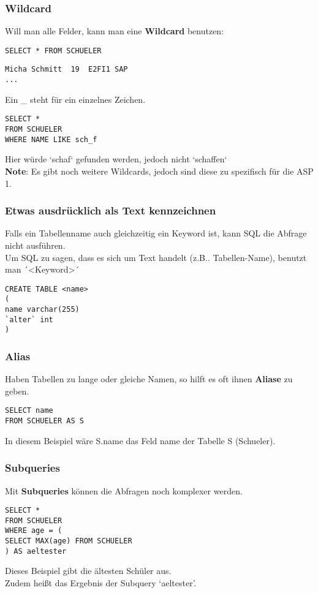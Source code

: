 \documentclass[asp1.tex]{subfiles}
\begin{document}
\subsubsection{Wildcard}
Will man alle Felder, kann man eine \textbf{Wildcard} benutzen:
\begin{lstlisting}
SELECT * FROM SCHUELER
\end{lstlisting}
\begin{verbatim}
Micha Schmitt  19  E2FI1 SAP
...
\end{verbatim}
Ein \_ steht  für  ein einzelnes Zeichen.
\begin{lstlisting}
SELECT *
FROM SCHUELER
WHERE NAME LIKE sch_f
\end{lstlisting}
Hier würde `schaf` gefunden werden,  jedoch nicht `schaffen` \\
\textbf{Note}: Es gibt noch weitere Wildcards, jedoch  sind diese zu spezifisch für die ASP 1.

\subsubsection{Etwas ausdrücklich als Text kennzeichnen}

Falls ein Tabellenname auch gleichzeitig ein Keyword ist, kann SQL die Abfrage nicht ausführen. \\
Um SQL zu sagen, dass es sich um Text handelt (z.B.. Tabellen-Name), benutzt man ´\textless Keyword\textgreater´

\begin{lstlisting}
CREATE TABLE <name>
(
name varchar(255)
`alter` int
)
\end{lstlisting}

\subsubsection{Alias}
Haben Tabellen zu lange oder gleiche Namen, so hilft es oft ihnen \textbf{Aliase} zu geben.
\begin{lstlisting}
SELECT name
FROM SCHUELER AS S
\end{lstlisting}
In diesem Beispiel wäre S.name das Feld name der Tabelle S (Schueler).

\subsubsection{Subqueries}
Mit \textbf{Subqueries} können die Abfragen noch komplexer werden.
\begin{lstlisting}
SELECT *
FROM SCHUELER
WHERE age = (
SELECT MAX(age) FROM SCHUELER
) AS aeltester
\end{lstlisting}
Dieses Beispiel gibt die ältesten Schüler aus. \\
Zudem heißt das Ergebnis  der Subquery `aeltester'.
\end{document}
